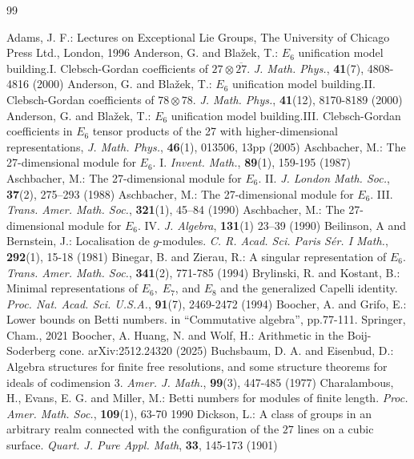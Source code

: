 \documentclass[12pt]{article}
\numberwithin{equation}{section}
\theoremstyle{definition}
\theoremstyle{remark}
\begin{document}
\begin{thebibliography}{99}
	 Adams, J. F.: {Lectures on Exceptional Lie Groups}, The University of Chicago Press Ltd., London, 1996
	 Anderson, G. and Blažek, T.: $E_6$ unification model building.I. Clebsch-Gordan coefficients of $27\otimes\overline{27}$. {\it J. Math. Phys.}, {\bf 41}(7), 4808-4816 (2000)
	 Anderson, G. and Blažek, T.: $E_6$ unification model building.II. Clebsch-Gordan coefficients of $78\otimes 78$. {\it J. Math. Phys.}, {\bf 41}(12), 8170-8189 (2000)
	 Anderson, G. and Blažek, T.: $E_6$ unification model building.III. Clebsch-Gordan coefficients in $E_6$ tensor products of the 27 with higher-dimensional representations, {\it J. Math. Phys.}, {\bf 46}(1), 013506, 13pp (2005)
	 Aschbacher, M.: The 27-dimensional module for $E_6$. I. {\it Invent. Math.}, {\bf 89}(1), 159-195 (1987)
	 Aschbacher, M.: The 27-dimensional module for $E_6$. II. {\it J. London Math. Soc.}, {\bf 37}(2), 275–293 (1988)
	 Aschbacher, M.: The 27-dimensional module for $E_6$. III. {\it Trans. Amer. Math. Soc.}, {\bf 321}(1), 45–84 (1990)
	 Aschbacher, M.: The 27-dimensional module for $E_6$. IV. {\it J. Algebra}, {\bf 131}(1) 23–39 (1990)
     Beilinson, A and Bernstein, J.: Localisation de $g$-modules. {\it C. R. Acad. Sci. Paris S\'er. I Math.}, {\bf 292}(1), 15-18 (1981)
	 Binegar, B. and  Zierau, R.: A singular representation of $E_6$. {\it Trans. Amer. Math. Soc.}, {\bf 341}(2), 771-785 (1994)
	 Brylinski, R. and Kostant, B.: Minimal representations of $E_6,\;E_7$, and $E_8$ and the generalized Capelli identity. {\it Proc. Nat. Acad. Sci. U.S.A.}, {\bf 91}(7), 2469-2472 (1994)
	 Boocher, A. and Grifo, E.: Lower bounds on Betti numbers. in ``Commutative algebra'', pp.77-111. Springer, Cham., 2021 
	 Boocher, A. Huang, N. and Wolf, H.: Arithmetic in the Boij-Soderberg cone. arXiv:2512.24320 (2025)
	 Buchsbaum, D. A. and Eisenbud, D.: Algebra structures for finite free resolutions, and some
	structure theorems for ideals of codimension $3$. {\it Amer. J. Math.}, {\bf 99}(3), 447-485 (1977)
	 Charalambous, H., Evans, E. G. and Miller, M.: Betti numbers for modules of finite length. {\it Proc. Amer. Math. Soc.}, {\bf 109}(1), 63-70 1990
	 Dickson, L.: A class of groups in an arbitrary realm connected with the configuration of the $27$ lines on a cubic surface. {\it Quart. J. Pure Appl. Math}, {\bf 33}, 145-173 (1901)

\end{thebibliography}
\end{document}
